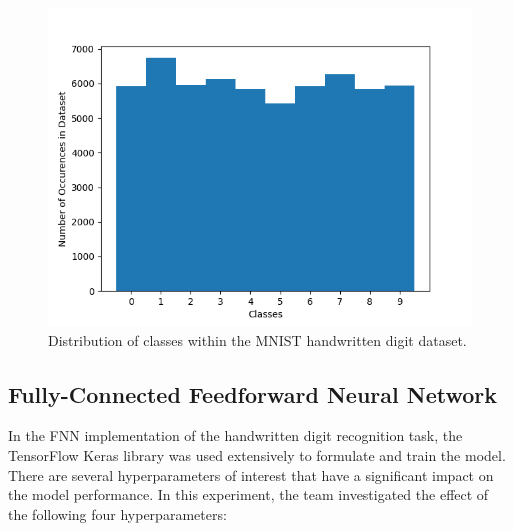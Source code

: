 \documentclass[a4paper]{article}
\begin{document}
\begin{figure}[h]
    \centering
    \includegraphics[scale=0.5]{images/mnist-class-dist.png}
    \caption{Distribution of classes within the MNIST handwritten digit dataset.}
    \label{fig:mnist-class-dist}
\end{figure}

\subsection{Fully-Connected Feedforward Neural Network}
In the FNN implementation of the handwritten digit recognition task, the TensorFlow Keras library was used extensively to formulate and train the model. There are several hyperparameters of interest that have a significant impact on the model performance. In this experiment, the team investigated the effect of the following four hyperparameters:
\end{document}
